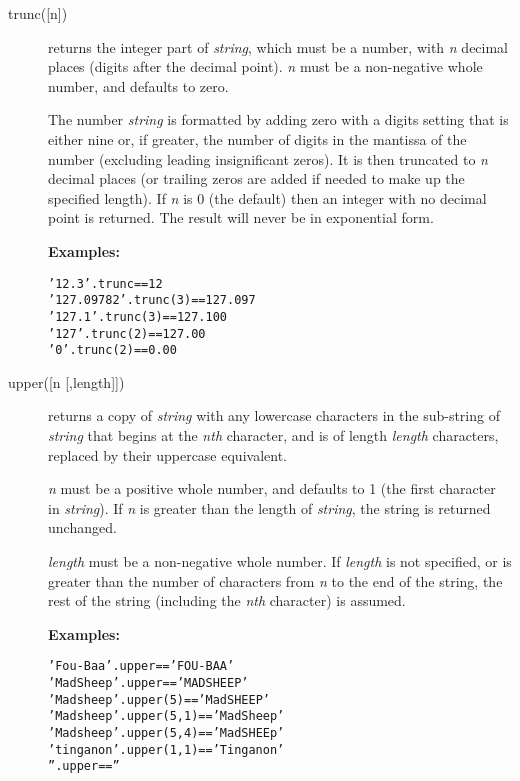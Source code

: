 \begin{description}
\item[trunc([n{]})]\label{reftrunc}
returns the integer part of \emph{string}, which must be a
number, with \emph{n} decimal places (digits after the decimal
point).
\emph{n} must be a non-negative whole number, and defaults to zero.
 
The number \emph{string} is formatted by adding zero with a digits
setting that is either nine or, if greater, the number of digits in the
mantissa of the number (excluding leading insignificant zeros).
It is then truncated to \emph{n} decimal places (or trailing zeros
are added if needed to make up the specified length).
If \emph{n} is 0 (the default) then an integer with no decimal
point is returned.
The result will never be in exponential form.
 
\textbf{Examples:}
\begin{alltt}
'12.3'.trunc         == 12
'127.09782'.trunc(3) == 127.097
'127.1'.trunc(3)     == 127.100
'127'.trunc(2)       == 127.00
'0'.trunc(2)         == 0.00
\end{alltt}

\item[upper([n [,length{]]})]\label{refupper}
returns a copy of \emph{string} with any lowercase characters in
the sub-string of \emph{string} that begins at the \emph{n}\emph{th}
character, and is of length \emph{length} characters, replaced by
their uppercase equivalent.
 
\emph{n} must be a positive whole number, and defaults to 1 (the
first character in \emph{string}).  If \emph{n} is greater than
the length of \emph{string}, the string is returned unchanged.
 
\emph{length} must be a non-negative whole number.
If \emph{length} is not specified, or is greater than the number of
characters from \emph{n} to the end of the string, the rest of the
string (including the \emph{n}\emph{th} character) is assumed.
 
\textbf{Examples:}
\begin{alltt}
'Fou-Baa'.upper        == 'FOU-BAA'
'Mad Sheep'.upper      == 'MAD SHEEP'
'Mad sheep'.upper(5)   == 'Mad SHEEP'
'Mad sheep'.upper(5,1) == 'Mad Sheep'
'Mad sheep'.upper(5,4) == 'Mad SHEEp'
'tinganon'.upper(1,1)  == 'Tinganon'
''.upper               == ''
\end{alltt}


\end{description}
